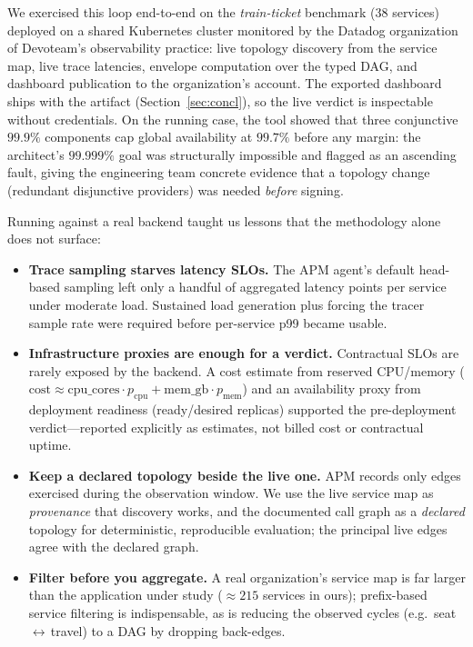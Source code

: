 \documentclass[conference]{IEEEtran}
\begin{document}
We exercised this loop end-to-end on the \emph{train-ticket} benchmark (38 services) deployed on a shared Kubernetes cluster monitored by the Datadog organization of Devoteam's observability practice: live topology discovery from the service map, live trace latencies, envelope computation over the typed DAG, and dashboard publication to the organization's account. The exported dashboard ships with the artifact (Section~\ref{sec:concl}), so the live verdict is inspectable without credentials. On the running case, the tool showed that three conjunctive $99.9\%$ components cap global availability at $99.7\%$ before any margin: the architect's $99.999\%$ goal was structurally impossible and flagged as an ascending fault, giving the engineering team concrete evidence that a topology change (redundant disjunctive providers) was needed \emph{before} signing.

Running against a real backend taught us lessons that the methodology alone does not surface:
\begin{itemize}
  \item[\textbf{L1}] \textbf{Trace sampling starves latency SLOs.} The APM agent's default head-based sampling left only a handful of aggregated latency points per service under moderate load. Sustained load generation plus forcing the tracer sample rate were required before per-service p99 became usable.
  \item[\textbf{L2}] \textbf{Infrastructure proxies are enough for a verdict.} Contractual SLOs are rarely exposed by the backend. A cost estimate from reserved CPU/memory ($\mathrm{cost} \approx \mathrm{cpu\_cores}\cdot p_{\mathrm{cpu}} + \mathrm{mem\_gb}\cdot p_{\mathrm{mem}}$) and an availability proxy from deployment readiness (ready/desired replicas) supported the pre-deployment verdict---reported explicitly as estimates, not billed cost or contractual uptime.
  \item[\textbf{L3}] \textbf{Keep a declared topology beside the live one.} APM records only edges exercised during the observation window. We use the live service map as \emph{provenance} that discovery works, and the documented call graph as a \emph{declared} topology for deterministic, reproducible evaluation; the principal live edges agree with the declared graph.
  \item[\textbf{L4}] \textbf{Filter before you aggregate.} A real organization's service map is far larger than the application under study (${\approx}215$ services in ours); prefix-based service filtering is indispensable, as is reducing the observed cycles (e.g.\ seat\,$\leftrightarrow$\,travel) to a DAG by dropping back-edges.
\end{itemize}
\end{document}
